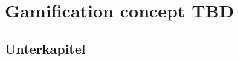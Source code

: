 
\section{Gamification concept TBD}
\label{sec:domainC}

\subsection{Unterkapitel}
\label{sec:domainAa}

